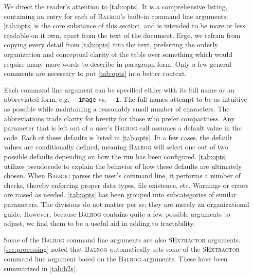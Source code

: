 \documentclass[11pt]{book}
\newcommand{\codett}[1]{\lstinline{#1}}
\newcommand{\balrog}{\textsc{Balrog}}
\newcommand{\sex}{\textsc{SExtractor}}
\newcommand{\opt}[1]{\codett{--#1}}
\begin{document}
We direct the reader's attention to \autoref{tab:opts}.
It is a comprehensive listing, containing an entry for each of \balrog{}'s built-in command line arguments.
\autoref{tab:opts} is the core substance of this section,
and is intended to be more or less readable on it own, apart from the text of the document.
Ergo, we refrain from copying every detail from \autoref{tab:opts} into the text, 
preferring the orderly organization and conceptual clarity
of the table over something which would require many more words to describe in paragraph form.
Only a few general comments are necessary to put \autoref{tab:opts} into better context.

Each command line argument can be specified either with its full name or an abbreviated form, e.g. \opt{image} vs. \opt{i}.
The full names attempt to be as intuitive as possible while maintaining a reasonably small number of characters.
The abbreviations trade clarity for brevity for those who prefer compactness. 
Any parameter that  is left out of a user's \balrog{} call assumes a default value in the code.
Each of these defaults is listed in \autoref{tab:opts}. 
In a few cases, the default values are conditionally defined, meaning \balrog{} will select one out of
two possible defaults depending on how the run has been configured.
\autoref{tab:opts} utilizes pseudocode to explain the behavior of how these defaults are ultimately chosen.
When \balrog{} parses the user's command line, it performs a number of checks, 
thereby enforcing proper data types, file existence, etc.
Warnings or errors are raised as needed.
\autoref{tab:opts} has been grouped into subcategories of similar parameters.
The divisions do not matter per se; they are merely an organizational guide.
However, because \balrog{} contains quite a few possible arguments to adjust,
we find them to be a useful aid in adding to tractability.

Some of the \balrog{} command line arguments are also \sex{} arguments.
\autoref{sec:processing} noted that \balrog{} automatically sets some of the \sex{} command line argument based on the \balrog{} arguments.
These have been summarized in \autoref{tab:b2s}.
\end{document}
